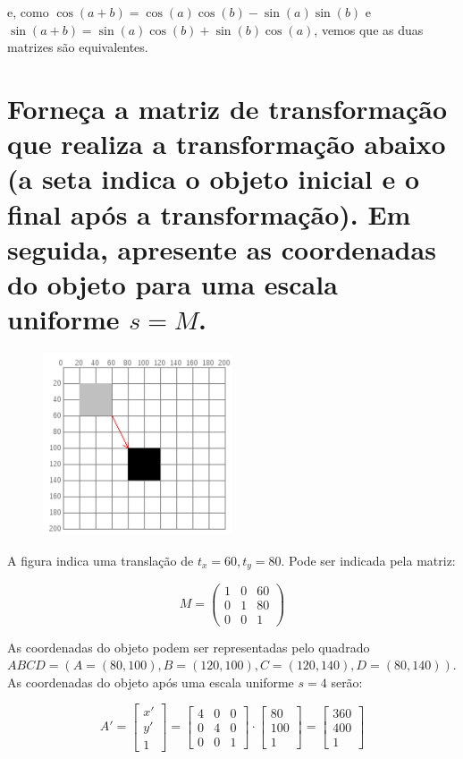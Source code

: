 \documentclass{article}
\begin{document}
\noindent e, como $\cos{(a + b)} = \cos{(a)} \cos{(b)} - \sin{(a)} \sin{(b)}$ e $\sin{(a + b)} = \sin{(a)} \cos{(b)} + \sin{(b)} \cos{(a)}$, vemos que as duas matrizes são equivalentes.

\section{Forneça a matriz de transformação que realiza a transformação abaixo (a seta indica o objeto inicial e o final após a transformação). Em seguida, apresente as coordenadas do objeto para uma escala uniforme $s = M$.}

\begin{figure}[ht!]
	\centering
	\includegraphics[width=0.5\textwidth]{img/img1.png}
\end{figure}

A figura indica uma translação de $t_x = 60, t_y = 80$. Pode ser indicada pela matriz:

$$M = \begin{pmatrix}
	1 & 0 & 60\\
	0 & 1 & 80\\
	0 & 0 & 1
\end{pmatrix}$$

As coordenadas do objeto podem ser representadas pelo quadrado $ABCD = (A=(80, 100), B=(120, 100), C=(120, 140), D=(80, 140))$. As coordenadas do objeto após uma escala uniforme $s = 4$ serão:

$$A' = \begin{bmatrix}
	x'\\
	y'\\
	1
\end{bmatrix} = \begin{bmatrix}
	4 & 0 & 0\\
	0 & 4 & 0\\
	0 & 0 & 1
\end{bmatrix} \cdot \begin{bmatrix}
	80\\
	100\\
	1
\end{bmatrix} = \begin{bmatrix}
	360\\
	400\\
	1
\end{bmatrix}$$
\end{document}
